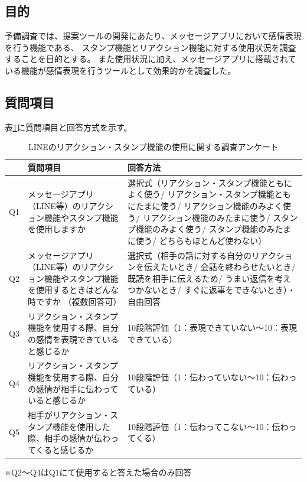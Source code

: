 \documentclass[11pt,a4paper]{ltjsreport}
\newcommand{\bhline}{\noalign{\hrule height 1.2pt}} %
\begin{document}
\subsection{目的}
予備調査では、提案ツールの開発にあたり、メッセージアプリにおいて感情表現を行う機能である、
スタンプ機能とリアクション機能に対する使用状況を調査することを目的とする。
また使用状況に加え、メッセージアプリに搭載されている機能が感情表現を行うツールとして効果的かを調査した。

\subsection{質問項目}
表\ref{table:Yobi_tyousa_sitsumon}に質問項目と回答方式を示す。

\vspace{\baselineskip} %
\begin{landscape}%
\begin{table}[!ph]
    \caption{LINEのリアクション・スタンプ機能の使用に関する調査アンケート}
    \label{table:Yobi_tyousa_sitsumon}
    \vspace{5mm}
    \centering
    \begin{tabular}{p{1cm}p{10cm}p{8.5cm}} %
        \bhline
         & 質問項目 & 回答方法  \\
        \hline
        Q1 &メッセージアプリ（LINE等）のリアクション機能やスタンプ機能を使用しますか   
           & 選択式（リアクション・スタンプ機能ともによく使う/
           リアクション・スタンプ機能ともにたまに使う/
           リアクション機能のみよく使う/
           リアクション機能のみたまに使う/
           スタンプ機能のみよく使う/
           スタンプ機能のみたまに使う/
           どちらもほとんど使わない） \\
        Q2 &メッセージアプリ（LINE等）のリアクション機能やスタンプ機能を使用するときはどんな時ですか （複数回答可） 
           & 選択式（相手の話に対する自分のリアクションを伝えたいとき/
           会話を終わらせたいとき/
           既読を相手に伝えるため/
           うまい返信を考えつかないとき/
           すぐに返事をできないとき）・自由回答 \\
        Q3 &リアクション・スタンプ機能を使用する際、自分の感情を表現できていると感じるか    
            & 10段階評価（1：表現できていない～10：表現できている） \\
        Q4 &リアクション・スタンプ機能を使用する際、自分の感情が相手に伝わっていると感じるか    
            & 10段階評価（1：伝わっていない～10：伝わっている） \\
        Q5 &相手がリアクション・スタンプ機能を使用した際、相手の感情が伝わってくると感じるか    
            & 10段階評価（1：伝わってこない～10：伝わってくる） \\
        \hline
    \end{tabular}
    \vspace{1cm} %
    \parbox{1.0\textwidth}{\small ※Q2～Q4はQ1にて使用すると答えた場合のみ回答}
\end{table}
\end{landscape}
\end{document}
